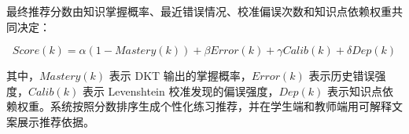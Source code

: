 最终推荐分数由知识掌握概率、最近错误情况、校准偏误次数和知识点依赖权重共同决定：

\begin{equation}
Score(k) = \alpha (1 - Mastery(k)) + \beta Error(k) + \gamma Calib(k) + \delta Dep(k)
\end{equation}

其中，$Mastery(k)$ 表示 DKT 输出的掌握概率，$Error(k)$ 表示历史错误强度，$Calib(k)$ 表示 Levenshtein 校准发现的偏误强度，$Dep(k)$ 表示知识点依赖权重。系统按照分数排序生成个性化练习推荐，并在学生端和教师端用可解释文案展示推荐依据。
